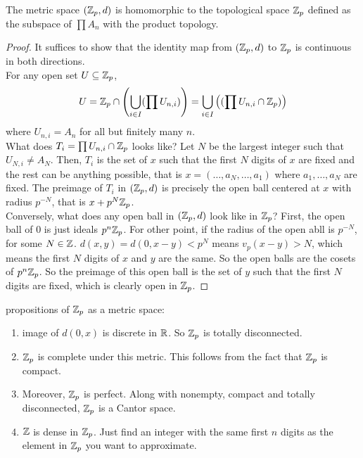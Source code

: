 \documentclass[15pt]{scrartcl}
\begin{document}
\begin{theorem}
    The metric space $(\mathbb Z_p,d)$ is homomorphic to the topological space $\mathbb Z_p$ defined as the subspace of $\prod A_n$ with the product topology.
\end{theorem}
\begin{proof}
    It suffices to show that the identity map from $(\mathbb Z_p,d)$ to $\mathbb Z_p$ is continuous in both directions.
    \\
    For any open set $U\subseteq \mathbb Z_p$, 
    \[U=\mathbb Z_p\cap \left(\bigcup_{i\in I}(\prod U_{n, i})\right)=\bigcup_{i\in I}\left((\prod U_{n, i}\cap \mathbb Z_p)\right)\] 
    where $U_{n,i}=A_n$ for all but finitely many $n$.
    \\

    What does $T_i=\prod U_{n, i}\cap \mathbb Z_p$ looks like? Let $N$ be the largest integer such that $U_{N,i}\neq A_N$. Then, $T_i$ is the set of $x$ such that the first $N$ digits of $x$ are fixed and the rest can be anything possible, that is $x=(\ldots,a_N,\ldots,a_1)$ where $a_1,\ldots,a_N$ are fixed. The preimage of $T_i$ in $(\mathbb Z_p,d)$ is precisely the open ball centered at $x$ with radius $p^{-N}$, that is $x+p^N\mathbb Z_p$. 
    \\

    Conversely, what does any open ball in $(\mathbb Z_p,d)$ look like in $\mathbb Z_p$? First, the open ball of $0$ is just ideals $p^n\mathbb Z_p$. For other point, if the radius of the open abll is $p^{-N}$, for some $N\in\mathbb Z$. $d(x,y)=d(0,x-y)<p^N$ means $v_p(x-y)>N$, which means the first $N$ digits of $x$ and $y$ are the same. So the open balls are the cosets of $p^n\mathbb Z_p$. So the preimage of this open ball is the set of $y$ such that the first $N$ digits are fixed, which is clearly open in $\mathbb Z_p$.
\end{proof}
\begin{proposition}
    propositions of $\mathbb Z_p$ as a metric space:
    \begin{enumerate}
        \item image of $d(0,x)$ is discrete in $\mathbb R$. So $\mathbb Z_p$ is totally disconnected.
        \item $\mathbb Z_p$ is complete under this metric. This follows from the fact that $\mathbb Z_p$ is compact.
        \item Moreover, $\mathbb Z_p$ is perfect. Along with nonempty, compact and totally disconnected, $\mathbb Z_p$ is a Cantor space.
        \item $\mathbb Z$ is dense in $\mathbb Z_p$. Just find an integer with the same first $n$ digits as the element in $\mathbb Z_p$ you want to approximate.
    \end{enumerate}
\end{proposition}
\end{document}
